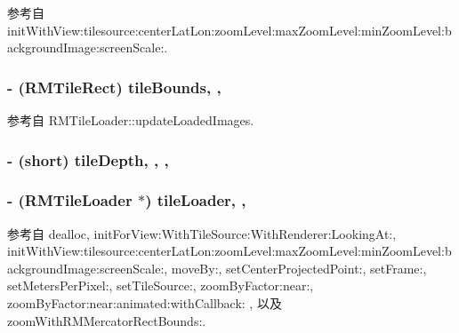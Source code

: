 参考自 init\-With\-View\-:tilesource\-:center\-Lat\-Lon\-:zoom\-Level\-:max\-Zoom\-Level\-:min\-Zoom\-Level\-:background\-Image\-:screen\-Scale\-:.

\hypertarget{interface_r_m_map_contents_a385e41b3717e62ef1d343b73144c1ef4}{
\subsubsection[{tile\-Bounds}]{\setlength{\rightskip}{0pt plus 5cm}-\/ ({\bf R\-M\-Tile\-Rect}) tile\-Bounds\hspace{0.3cm}{\ttfamily [read]}, {\ttfamily [atomic]}, {\ttfamily [assign]}}}\label{interface_r_m_map_contents_a385e41b3717e62ef1d343b73144c1ef4}


参考自 R\-M\-Tile\-Loader\-::update\-Loaded\-Images.

\hypertarget{interface_r_m_map_contents_ad55a0b34afd6bd4b228f8ae3555f7d98}{
\subsubsection[{tile\-Depth}]{\setlength{\rightskip}{0pt plus 5cm}-\/ (short) tile\-Depth\hspace{0.3cm}{\ttfamily [read]}, {\ttfamily [write]}, {\ttfamily [atomic]}, {\ttfamily [assign]}}}\label{interface_r_m_map_contents_ad55a0b34afd6bd4b228f8ae3555f7d98}
\hypertarget{interface_r_m_map_contents_ad7c6bc753e0b9a1cbaa5e9dcb4a5e853}{
\subsubsection[{tile\-Loader}]{\setlength{\rightskip}{0pt plus 5cm}-\/ ({\bf R\-M\-Tile\-Loader} $\ast$) tile\-Loader\hspace{0.3cm}{\ttfamily [read]}, {\ttfamily [atomic]}, {\ttfamily [assign]}}}\label{interface_r_m_map_contents_ad7c6bc753e0b9a1cbaa5e9dcb4a5e853}


参考自 dealloc, init\-For\-View\-:\-With\-Tile\-Source\-:\-With\-Renderer\-:\-Looking\-At\-:, init\-With\-View\-:tilesource\-:center\-Lat\-Lon\-:zoom\-Level\-:max\-Zoom\-Level\-:min\-Zoom\-Level\-:background\-Image\-:screen\-Scale\-:, move\-By\-:, set\-Center\-Projected\-Point\-:, set\-Frame\-:, set\-Meters\-Per\-Pixel\-:, set\-Tile\-Source\-:, zoom\-By\-Factor\-:near\-:, zoom\-By\-Factor\-:near\-:animated\-:with\-Callback\-: , 以及 zoom\-With\-R\-M\-Mercator\-Rect\-Bounds\-:.

